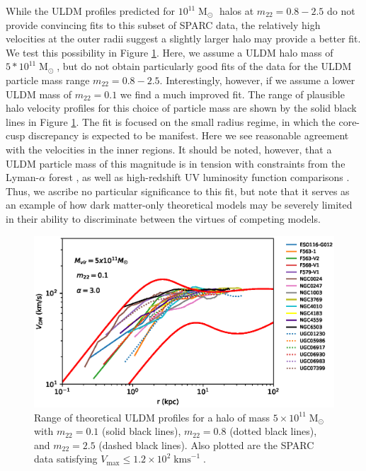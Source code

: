 \documentclass[a4paper,11pt]{article}
\begin{document}
While the ULDM profiles predicted for $10^{11}\operatorname{M}_{\odot}$ halos at $m_{22} = 0.8 - 2.5$ do not provide convincing fits to this subset of SPARC data, the relatively high velocities at the outer radii suggest a slightly larger halo may provide a better fit. We test this possibility in Figure \ref{fig:velocity_23}. Here, we assume a ULDM halo mass of $5*10^11\operatorname{M}_{\odot}$, but do not obtain particularly good fits of the data for the ULDM particle mass range $m_{22} = 0.8 - 2.5$. Interestingly, however, if we assume a lower ULDM mass of $m_{22} = 0.1$ we find a much improved fit. The range of plausible halo velocity profiles for this choice of particle mass are shown by the solid black lines in Figure \ref{fig:velocity_23}. The fit is focused on the small radius regime, in which the core-cusp discrepancy is expected to be manifest. Here we see reasonable agreement with the velocities in the inner regions. It should be noted, however, that a ULDM particle mass of this magnitude is in tension with constraints from the Lyman-$\alpha$ forest \cite{Amendola:2005ad}, as well as high-redshift UV luminosity function comparisons \cite{Bozek:2014uqa}. Thus, we ascribe no particular significance to this fit, but note that it serves as an example of how dark matter-only theoretical models may be severely limited in their ability to discriminate between the virtues of competing models.

\begin{figure}
\centering
\includegraphics[scale = 0.8, trim={0cm 2.5cm 1cm 0.35cm}]{pics/best_match.eps} 
\caption{Range of theoretical ULDM profiles for a halo of mass $5\times 10^{11}\operatorname{M}_{\odot}$ with $m_{22} = 0.1$ (solid black lines), $m_{22} = 0.8$ (dotted black lines), and $m_{22} = 2.5$ (dashed black lines). Also plotted are the SPARC data satisfying $V_{\mathrm{max}}\leq 1.2\times 10^2 \operatorname{kms}^{-1}$. }\label{fig:velocity_23}
\end{figure}
\end{document}
